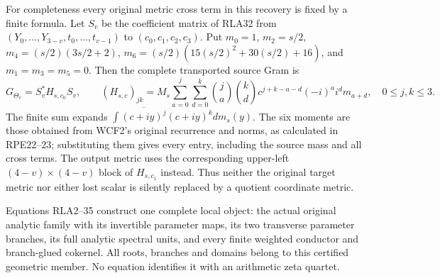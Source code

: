 For completeness every original metric cross term in this recovery
is fixed by a finite formula.  Let $S_v$ be the coefficient matrix
of RLA32 from $(Y_0,\ldots,Y_{3-v},t_0,\ldots,t_{v-1})$ to
$(c_0,c_1,c_2,c_3)$.  Put $m_0=1$, $m_2=s/2$,
$m_4=(s/2)(3s/2+2)$, $m_6=(s/2)(15(s/2)^2+30(s/2)+16)$,
and $m_1=m_3=m_5=0$.  Then the complete transported source Gram is
\[
 G_{\Theta_v}=S_v^*H_{s,c_0}S_v,\qquad
 (H_{s,c})_{jk}=M_s\sum_{a=0}^j\sum_{d=0}^k
 \binom ja\binom kd c^{j+k-a-d}(-i)^ai^d m_{a+d},
 \quad0\le j,k\le3.
 \tag{RLA35}
\]
The finite sum expands
$\int\overline{(c+iy)^j}(c+iy)^kdm_s(y)$.
The six moments are those obtained from WCF2's original recurrence
and norms, as calculated in RPE22--23; substituting them gives
every entry, including the source mass and all cross terms.
The output metric uses the corresponding upper-left
$(4-v)\times(4-v)$ block of $H_{s,c_1}$ instead.
Thus neither the original target metric nor either lost scalar is
silently replaced by a quotient coordinate metric.

Equations RLA2--35 construct one complete local object: the actual
original analytic family with its invertible parameter maps, its
two transverse parameter branches, its full analytic spectral units,
and every finite weighted conductor and branch-glued cokernel.
All roots, branches and domains belong to this certified geometric
member.  No equation identifies it with an arithmetic zeta quartet.

